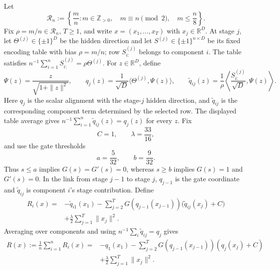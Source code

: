 \documentclass{article}
\newcommand{\R}{\mathbb{R}}
\theoremstyle{definition}
\begin{document}
Let
\begin{equation}
 \mathcal R_n:=\left\{\frac mn:
 m\in\mathbb Z_{>0},\quad m\equiv n\pmod2,\quad m\le\frac n8\right\}.
 \label{eq:nonconvex-local-bias-grid}
\end{equation}
Fix $\rho=m/n\in\mathcal R_n$, $T\ge1$, and write
$x=(x_1,\ldots,x_T)$ with $x_j\in\R^D$.  At stage
$j$, let $\Theta^{(j)}\in\{\pm1\}^D$ be the hidden direction and let
$S^{(j)}\in\{\pm1\}^{n\times D}$ be its fixed encoding table with bias
$\rho=m/n$; row $S^{(j)}_{i:}$ belongs to component $i$.  The table satisfies
$n^{-1}\sum_{i=1}^nS^{(j)}_{i:}=\rho\Theta^{(j)}$.  For $z\in\R^D$, define
\begin{equation}
 \Psi(z)=\frac{z}{\sqrt{1+\|z\|^2}},\qquad
 q_j(z)=\frac1{\sqrt D}\langle\Theta^{(j)},\Psi(z)\rangle,
 \qquad
 \widetilde q_{ij}(z)=\frac1\rho
 \left\langle\frac{S^{(j)}_{i:}}{\sqrt D},\Psi(z)\right\rangle.
 \label{eq:nonconvex-local-radial-coordinates}
\end{equation}
Here $q_j$ is the scalar alignment with the stage-$j$ hidden direction, and
$\widetilde q_{ij}$ is the corresponding component term determined by the
selected row.  The displayed table average gives
$n^{-1}\sum_{i=1}^n\widetilde q_{ij}(z)=q_j(z)$ for every $z$.
Fix
\begin{equation}
    C=1,
    \qquad \lambda=\frac{33}{16},
\end{equation}
and use the gate thresholds
\begin{equation}
 a=\frac5{32},
 \qquad
 b=\frac9{32}.
 \label{eq:nonconvex-local-gate-thresholds}
\end{equation}
Thus $s\le a$ implies $G(s)=G'(s)=0$, whereas $s\ge b$ implies
$G(s)=1$ and $G'(s)=0$.  In the link from stage $j-1$ to stage $j$,
$q_{j-1}$ is the gate coordinate and $\widetilde q_{ij}$ is component $i$'s
stage contribution.  Define
\begin{equation}
\begin{aligned}
 R_i(x)
 ={}&-\widetilde q_{i1}(x_1)
 -\sum_{j=2}^T
 G(q_{j-1}(x_{j-1}))
 \bigl(\widetilde q_{ij}(x_j)+C\bigr)\\
 &+\frac\lambda2\sum_{j=1}^T\|x_j\|^2.
\end{aligned}
\label{eq:uniform-component}
\end{equation}
Averaging over components and using
$n^{-1}\sum_i\widetilde q_{ij}=q_j$ gives
\begin{equation}
\begin{aligned}
 R(x):=\frac1n\sum_{i=1}^nR_i(x)
 ={}&-q_1(x_1)
 -\sum_{j=2}^T
 G(q_{j-1}(x_{j-1}))(q_j(x_j)+C)\\
 &+\frac\lambda2\sum_{j=1}^T\|x_j\|^2.
\end{aligned}
\label{eq:uniform-average}
\end{equation}
\end{document}
